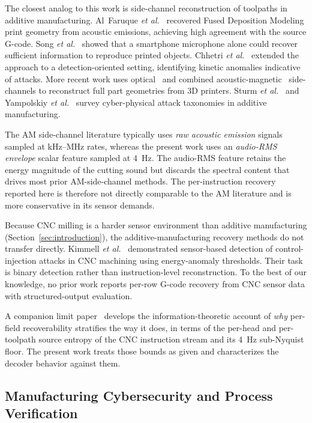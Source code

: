 \documentclass[sensors,article,submit,moreauthors,pdftex]{Definitions/mdpi}
\newcommand{\etal}{\textit{et al.}}
\begin{document}
The closest analog to this work is side-channel reconstruction of toolpaths in additive manufacturing. Al~Faruque \etal~\cite{alfaruque2016acoustic} recovered Fused Deposition Modeling print geometry from acoustic emissions, achieving high agreement with the source G-code. Song \etal~\cite{song2016my} showed that a smartphone microphone alone could recover sufficient information to reproduce printed objects. Chhetri \etal~\cite{chhetri2016kcad} extended the approach to a detection-oriented setting, identifying kinetic anomalies indicative of attacks. More recent work uses optical~\cite{chattopadhyay2025video} and combined acoustic-magnetic~\cite{jamarani2024screg} side-channels to reconstruct full part geometries from 3D printers. Sturm \etal~\cite{sturm2014cyber} and Yampolskiy \etal~\cite{yampolskiy2018security} survey cyber-physical attack taxonomies in additive manufacturing.

The AM side-channel literature typically uses \emph{raw acoustic emission} signals sampled at kHz--MHz rates, whereas the present work uses an \emph{audio-RMS envelope} scalar feature sampled at $4$~Hz. The audio-RMS feature retains the energy magnitude of the cutting sound but discards the spectral content that drives most prior AM-side-channel methods. The per-instruction recovery reported here is therefore not directly comparable to the AM literature and is more conservative in its sensor demands.

Because CNC milling is a harder sensor environment than additive manufacturing (Section~\ref{sec:introduction}), the additive-manufacturing recovery methods do not transfer directly. Kimmell \etal~\cite{kimmell2025cnc} demonstrated sensor-based detection of control-injection attacks in CNC machining using energy-anomaly thresholds. Their task is binary detection rather than instruction-level reconstruction. To the best of our knowledge, no prior work reports per-row G-code recovery from CNC sensor data with structured-output evaluation.

A companion limit paper~\cite{paperB_entropy} develops the information-theoretic account of \emph{why} per-field recoverability stratifies the way it does, in terms of the per-head and per-toolpath source entropy of the CNC instruction stream and its 4~Hz sub-Nyquist floor. The present work treats those bounds as given and characterizes the decoder behavior against them.

\subsection{Manufacturing Cybersecurity and Process Verification}
\label{sec:related-security}
\end{document}
